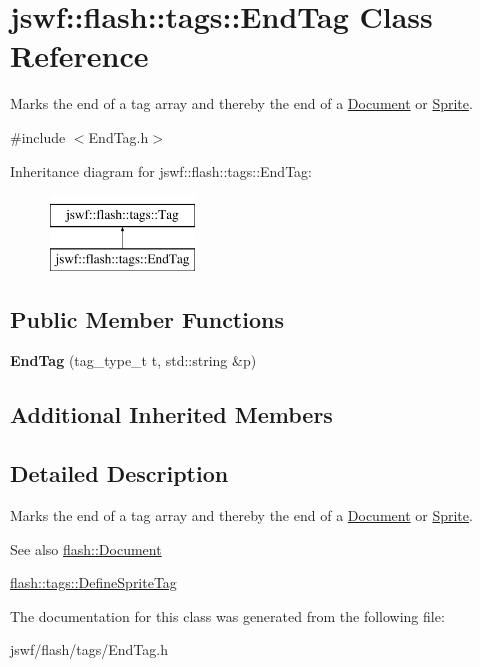\hypertarget{classjswf_1_1flash_1_1tags_1_1_end_tag}{\section{jswf\+:\+:flash\+:\+:tags\+:\+:End\+Tag Class Reference}
\label{classjswf_1_1flash_1_1tags_1_1_end_tag}
}


Marks the end of a tag array and thereby the end of a \hyperlink{classjswf_1_1flash_1_1_document}{Document} or \hyperlink{classjswf_1_1flash_1_1_sprite}{Sprite}.  




{\ttfamily \#include $<$End\+Tag.\+h$>$}

Inheritance diagram for jswf\+:\+:flash\+:\+:tags\+:\+:End\+Tag\+:\begin{figure}[H]
\begin{center}
\leavevmode
\includegraphics[height=2.000000cm]{classjswf_1_1flash_1_1tags_1_1_end_tag}
\end{center}
\end{figure}
\subsection*{Public Member Functions}
\begin{DoxyCompactItemize}
\item 
\hypertarget{classjswf_1_1flash_1_1tags_1_1_end_tag_a03e91c253ceeafebef3ec1f8c19780a4}{{\bfseries End\+Tag} (tag\+\_\+type\+\_\+t t, std\+::string \&p)}\label{classjswf_1_1flash_1_1tags_1_1_end_tag_a03e91c253ceeafebef3ec1f8c19780a4}

\end{DoxyCompactItemize}
\subsection*{Additional Inherited Members}


\subsection{Detailed Description}
Marks the end of a tag array and thereby the end of a \hyperlink{classjswf_1_1flash_1_1_document}{Document} or \hyperlink{classjswf_1_1flash_1_1_sprite}{Sprite}. 

\begin{DoxySeeAlso}{See also}
\hyperlink{classjswf_1_1flash_1_1_document}{flash\+::\+Document} 

\hyperlink{classjswf_1_1flash_1_1tags_1_1_define_sprite_tag}{flash\+::tags\+::\+Define\+Sprite\+Tag} 
\end{DoxySeeAlso}


The documentation for this class was generated from the following file\+:\begin{DoxyCompactItemize}
\item 
jswf/flash/tags/End\+Tag.\+h\end{DoxyCompactItemize}
